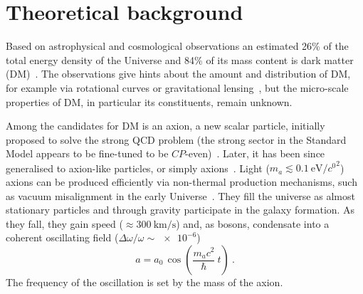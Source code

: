 








\section{Theoretical background}
Based on astrophysical and cosmological observations an estimated 26\% of the total energy density of the Universe and 84\% of its mass content is dark matter (DM)~\cite{Planck2015}. The observations give hints about the amount and distribution of DM, for example via rotational curves or gravitational lensing~\cite{ApJ1990}, but the micro-scale properties of DM, in particular its constituents, remain unknown.

Among the candidates for DM is an axion, a new scalar particle, initially proposed to solve the strong QCD problem (the strong sector in the Standard Model appears to be fine-tuned to be $CP$-even)~\cite{PhysRevLett.38.1440,PQ1977B,Weinberg1978,Wilczek1978,Kim1979,Zakharov1980,Zhitnitsky1980B,Srednicki1981}. Later, it has been since generalised to axion-like particles, or simply axions~\cite{Witten1984,Conlon2006,Witten2006,Arvanitaki2010,Arias2012,Marsh2015Review}. Light ($m_a \lesssim \SI[per-mode=symbol]{0.1}{\electronvolt\per\clight\squared}$) axions can be produced efficiently via non-thermal production mechanisms, such as vacuum misalignment in the early Universe~\cite{Preskill1983cosmo,Sikivie1983cosmo,Dine1983cosmo}. They fill the universe as almost stationary particles and through gravity participate in the galaxy formation. As they fall, they gain speed ($\approx \SI[per-mode=symbol]{300}{\kilo\metre\per\second}$) and, as bosons, condensate into a coherent oscillating field ($\Delta\omega / \omega \sim \num{e-6}$)~\cite{Marsh2015Review}
\begin{equation}
  a = a_0 \, \cos\left(\frac{ m_a c^2 }{\hbar} \ t\right) \ .
\end{equation}
The frequency of the oscillation is set by the mass of the axion.

